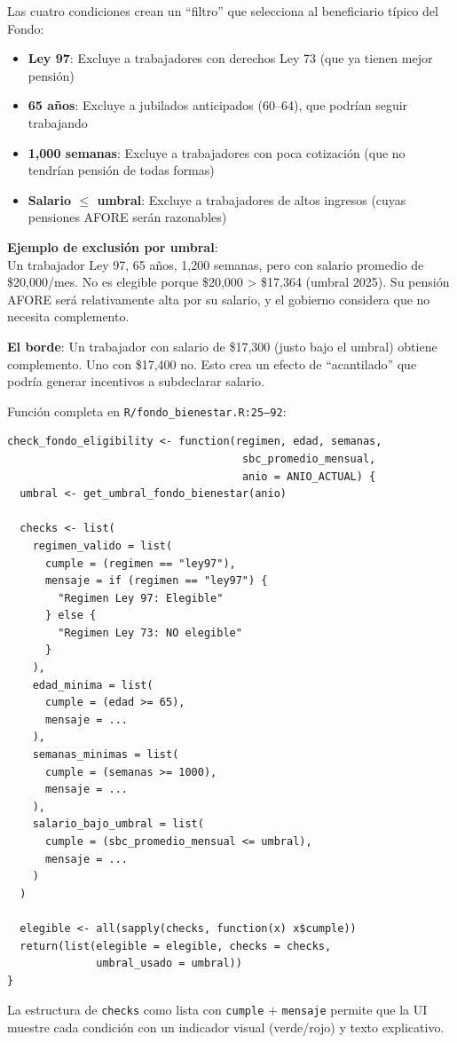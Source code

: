 \documentclass[11pt,a4paper]{report}
\begin{document}
\begin{tcolorbox}[colback=green!5!white, colframe=green!50!black, title=\textbf{Intuici\'on}]
Las cuatro condiciones crean un ``filtro'' que selecciona al beneficiario t\'ipico del Fondo:

\begin{itemize}[nosep]
\item \textbf{Ley 97}: Excluye a trabajadores con derechos Ley 73 (que ya tienen mejor pensi\'on)
\item \textbf{65 a\~nos}: Excluye a jubilados anticipados (60--64), que podr\'ian seguir trabajando
\item \textbf{1,000 semanas}: Excluye a trabajadores con poca cotizaci\'on (que no tendr\'ian pensi\'on de todas formas)
\item \textbf{Salario $\leq$ umbral}: Excluye a trabajadores de altos ingresos (cuyas pensiones AFORE ser\'an razonables)
\end{itemize}

\textbf{Ejemplo de exclusi\'on por umbral}:\\
Un trabajador Ley 97, 65 a\~nos, 1,200 semanas, pero con salario promedio de \$20,000/mes. No es elegible porque \$20,000 > \$17,364 (umbral 2025). Su pensi\'on AFORE ser\'a relativamente alta por su salario, y el gobierno considera que no necesita complemento.

\textbf{El borde}: Un trabajador con salario de \$17,300 (justo bajo el umbral) obtiene complemento. Uno con \$17,400 no. Esto crea un efecto de ``acantilado'' que podr\'ia generar incentivos a subdeclarar salario.
\end{tcolorbox}

\begin{tcolorbox}[colback=orange!5!white, colframe=orange!75!black, title=\textbf{Aplicaci\'on en C\'odigo}]
Funci\'on completa en \texttt{R/fondo\_bienestar.R:25--92}:

\begin{lstlisting}
check_fondo_eligibility <- function(regimen, edad, semanas,
                                     sbc_promedio_mensual,
                                     anio = ANIO_ACTUAL) {
  umbral <- get_umbral_fondo_bienestar(anio)

  checks <- list(
    regimen_valido = list(
      cumple = (regimen == "ley97"),
      mensaje = if (regimen == "ley97") {
        "Regimen Ley 97: Elegible"
      } else {
        "Regimen Ley 73: NO elegible"
      }
    ),
    edad_minima = list(
      cumple = (edad >= 65),
      mensaje = ...
    ),
    semanas_minimas = list(
      cumple = (semanas >= 1000),
      mensaje = ...
    ),
    salario_bajo_umbral = list(
      cumple = (sbc_promedio_mensual <= umbral),
      mensaje = ...
    )
  )

  elegible <- all(sapply(checks, function(x) x$cumple))
  return(list(elegible = elegible, checks = checks,
              umbral_usado = umbral))
}
\end{lstlisting}

La estructura de \texttt{checks} como lista con \texttt{cumple} + \texttt{mensaje} permite que la UI muestre cada condici\'on con un indicador visual (verde/rojo) y texto explicativo.
\end{tcolorbox}
\end{document}
